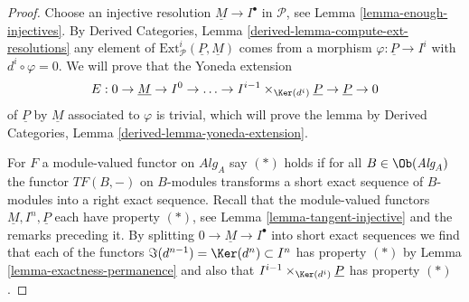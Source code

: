 \begin{proof}
Choose an injective resolution $\underline{M} \to I^\bullet$ in
$\mathcal{P}$, see
Lemma \ref{lemma-enough-injectives}.
By
Derived Categories, Lemma \ref{derived-lemma-compute-ext-resolutions}
any element of $\text{Ext}^i_\mathcal{P}(\underline{P}, \underline{M})$
comes from a morphism $\varphi : \underline{P} \to I^i$ with
$d^i \circ \varphi = 0$. We will prove that the
Yoneda extension
$$
E : 0 \to \underline{M} \to I^0 \to \ldots \to
I^{i - 1} \times_{\Ker(d^i)} \underline{P} \to \underline{P} \to 0
$$
of $\underline{P}$ by $\underline{M}$
associated to $\varphi$ is trivial, which will prove the lemma by
Derived Categories, Lemma \ref{derived-lemma-yoneda-extension}.

\medskip\noindent
For $F$ a module-valued functor on $\textit{Alg}_A$
say $(*)$ holds if for all $B \in \Ob(\textit{Alg}_A)$ the
functor $TF(B, -)$ on $B$-modules transforms a short exact sequence
of $B$-modules into a right exact sequence.
Recall that the module-valued functors $\underline{M}, I^n, \underline{P}$
each have property $(*)$, see
Lemma \ref{lemma-tangent-injective}
and the remarks preceding it.
By splitting $0 \to \underline{M} \to I^\bullet$ into short
exact sequences we find that each of the functors
$\Im(d^{n - 1}) = \Ker(d^n) \subset I^n$ has property $(*)$ by
Lemma \ref{lemma-exactness-permanence}
and also that $I^{i - 1} \times_{\Ker(d^i)} \underline{P}$ has property
$(*)$.


\end{proof}
